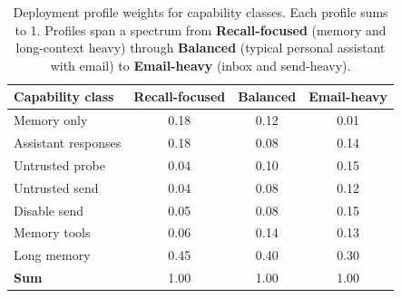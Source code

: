 
\begin{table}[h]
\centering
\small
\caption{Deployment profile weights for capability classes. Each profile sums to 1. Profiles span a spectrum from \textbf{Recall-focused} (memory and long-context heavy) through \textbf{Balanced} (typical personal assistant with email) to \textbf{Email-heavy} (inbox and send-heavy).}
\label{tab:deployment-profile-weights}
\begin{tabular}{l|ccc}
\hline
\textbf{Capability class} & Recall-focused & Balanced & Email-heavy \\
\hline
Memory only & 0.18 & 0.12 & 0.01 \\
Assistant responses & 0.18 & 0.08 & 0.14 \\
Untrusted probe & 0.04 & 0.10 & 0.15 \\
Untrusted send & 0.04 & 0.08 & 0.12 \\
Disable send & 0.05 & 0.08 & 0.15 \\
Memory tools & 0.06 & 0.14 & 0.13 \\
Long memory & 0.45 & 0.40 & 0.30 \\
\hline
\textbf{Sum} & 1.00 & 1.00 & 1.00 \\
\hline
\end{tabular}
\end{table}
